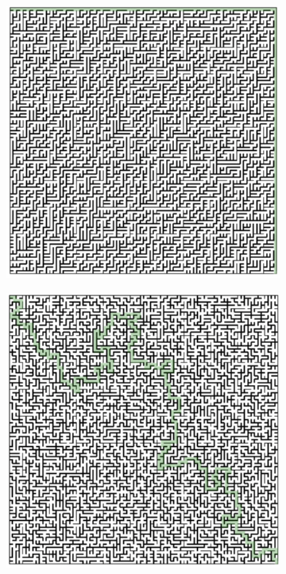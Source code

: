 \begin{figure}[!h]
	\centering
	\begin{subfigure}{.33\textwidth}
	  \centering
	  \includegraphics[width=1\linewidth]{perfectBinary.png}
	  \caption{}
	  \label{fig:sub1}
	\end{subfigure}
	\begin{subfigure}{.33\textwidth}
	  \centering
	  \includegraphics[width=1\linewidth]{perfectAldous.png}

\end{subfigure}
\end{figure}
